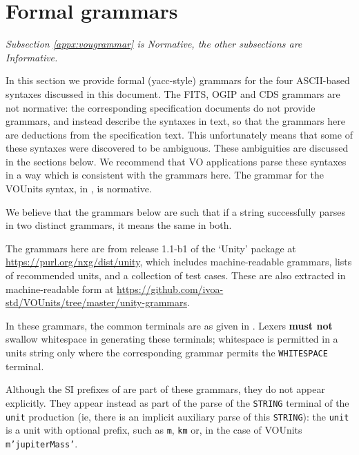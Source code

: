 \documentclass[11pt,a4paper]{ivoa}
\newcommand*\norm[1]{\textbf{\color{ivoacolor}#1}}
\begin{document}
\clearpage
\section{Formal grammars\label{appx:grammar}}

\emph{Subsection \ref{appx:vougrammar} is Normative, the other
    subsections are Informative.}

In this section we provide formal (yacc-style) grammars for the four
ASCII-based syntaxes discussed in this document.  The FITS, OGIP and
CDS grammars are not normative: the corresponding specification
documents do not provide grammars, and instead describe the syntaxes
in text, so that the grammars here are deductions from the
specification text.
This unfortunately means that some of these syntaxes were discovered to be ambiguous.
These ambiguities are discussed in the sections below.  We recommend
that VO applications parse these syntaxes in a way which is consistent
with the grammars here.
%
The grammar for the VOUnits syntax, in , is normative.

We believe that the grammars below are such that if a string
successfully parses in two distinct grammars, it means the same in
both.

The grammars here are from release 1.1-b1 of the `Unity' package at
\url{https://purl.org/nxg/dist/unity}, which includes machine-readable
grammars, lists of recommended units, and a collection of test cases.  These are also extracted in
machine-readable form
at \url{https://github.com/ivoa-std/VOUnits/tree/master/unity-grammars}.

In these grammars, the common terminals are as given in
.  Lexers \norm{must not} swallow whitespace
in generating these terminals; whitespace is permitted in a units
string only where the corresponding grammar permits
the \texttt{WHITESPACE} terminal.

Although the SI prefixes of  are part of
these grammars, they do not appear explicitly.  They appear instead as
part of the parse of the \texttt{STRING} terminal of the \texttt{unit}
production (ie, there is an implicit auxiliary parse of this
\texttt{STRING}): the \texttt{unit} is a unit with optional prefix,
such as \texttt{m}, \texttt{km} or, in the case of VOUnits \texttt{m'jupiterMass'}.
\end{document}
